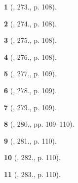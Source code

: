 \documentclass{article}
\newtheorem{baitoan}{}
\begin{document}
\begin{baitoan}[\cite{Nguyen_Buu_Can_500_BT_Hoa_Hoc_THCS}, 273., p. 108]
	
\end{baitoan}

\begin{baitoan}[\cite{Nguyen_Buu_Can_500_BT_Hoa_Hoc_THCS}, 274., p. 108]
	
\end{baitoan}

\begin{baitoan}[\cite{Nguyen_Buu_Can_500_BT_Hoa_Hoc_THCS}, 275., p. 108]
	
\end{baitoan}

\begin{baitoan}[\cite{Nguyen_Buu_Can_500_BT_Hoa_Hoc_THCS}, 276., p. 108]
	
\end{baitoan}

\begin{baitoan}[\cite{Nguyen_Buu_Can_500_BT_Hoa_Hoc_THCS}, 277., p. 109]
	
\end{baitoan}

\begin{baitoan}[\cite{Nguyen_Buu_Can_500_BT_Hoa_Hoc_THCS}, 278., p. 109]
	
\end{baitoan}

\begin{baitoan}[\cite{Nguyen_Buu_Can_500_BT_Hoa_Hoc_THCS}, 279., p. 109]
	
\end{baitoan}

\begin{baitoan}[\cite{Nguyen_Buu_Can_500_BT_Hoa_Hoc_THCS}, 280., pp. 109--110]
	
\end{baitoan}

\begin{baitoan}[\cite{Nguyen_Buu_Can_500_BT_Hoa_Hoc_THCS}, 281., p. 110]
	
\end{baitoan}

\begin{baitoan}[\cite{Nguyen_Buu_Can_500_BT_Hoa_Hoc_THCS}, 282., p. 110]
	
\end{baitoan}

\begin{baitoan}[\cite{Nguyen_Buu_Can_500_BT_Hoa_Hoc_THCS}, 283., p. 110]
	
\end{baitoan}
\end{document}
